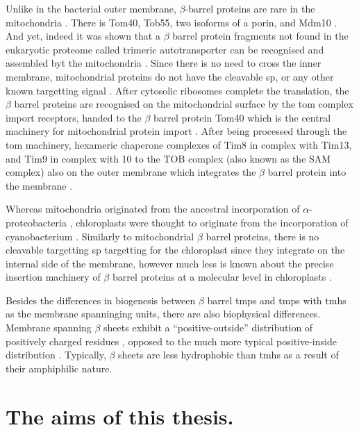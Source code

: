 Unlike in the bacterial outer membrane, $\beta$-barrel proteins are rare in the mitochondria \cite{Ulrich2015}.
There is Tom40, Tob55, two isoforms of a porin, and Mdm10 \cite{Ulrich2015}.
And yet, indeed it was shown that a $\beta$ barrel protein fragments not found in the eukaryotic proteome called trimeric autotransporter can be recognised and assembled byt the mitochondria \cite{Muller2011}.
Since there is no need to cross the inner membrane, mitochondrial proteins do not have the cleavable \gls{sp}, or any other known targetting signal \cite{Ulrich2015}.
After cytosolic ribosomes complete the translation, the $\beta$ barrel proteins are recognised on the mitochondrial surface by the \gls{tom} complex import receptors, handed to the $\beta$ barrel protein Tom40 which is the central machinery for mitochondrial protein import \cite{Chachinska2009}.
After being processed through the \gls{tom} machinery, hexameric chaperone complexes of Tim8 in complex with Tim13, and Tim9 in complex with 10 to the TOB complex (also known as the SAM complex) also on the outer membrane which integrates the $\beta$ barrel protein into the membrane \cite{Wiedermann2003, Paschen2003, Gentle2004}.

Whereas mitochondria originated from the ancestral incorporation of $\alpha$\--proteobacteria \cite{Gray1999}, chloroplasts were thought to originate from the incorporation of cyanobacterium \cite{McFadden2001}.
Similarly to mitochondrial $\beta$ barrel proteins, there is no cleavable targetting \gls{sp} targetting for the chloroplast since they integrate on the internal side of the membrane, however much less is known about the precise insertion machinery of $\beta$ barrel proteins at a molecular level in chloroplasts \cite{Ulrich2015}.

Besides the differences in biogenesis between $\beta$ barrel \gls{tmp}s and \gls{tmp}s with \gls{tmh}s as the membrane spanninging units, there are also biophysical differences.
Membrane spanning $\beta$ sheets exhibit a ``positive\--outside'' distribution of positively charged residues \cite{Pogozheva2013}, opposed to the much more typical positive\--inside distribution \cite{VonHeijne1989, Andersson1992, Pogozheva2013, Sharpe2010, Baeza-Delgado2013}.
Typically, $\beta$ sheets are less hydrophobic than \gls{tmh}s \cite{Tamm2004} as a result of their amphiphilic nature.

\section{The aims of this thesis.}

